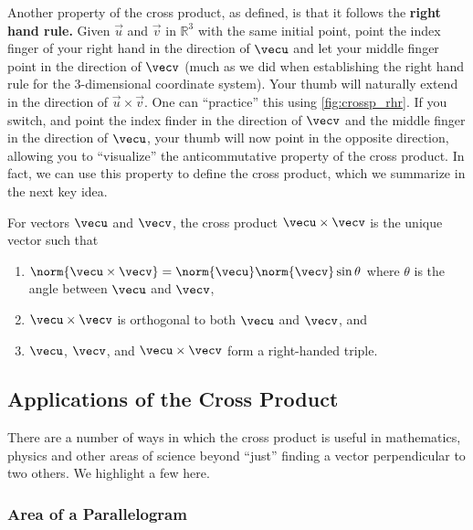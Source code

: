 Another property of the cross product, as defined, is that it follows the \textbf{right hand rule.} Given $\vec u$ and $\vec v$ in $\mathbb{R}^3$ with the same initial point, point the index finger of your right hand in the direction of $\vecu$ and let your middle finger point in the direction of $\vecv$ (much as we did when establishing the right hand rule for the 3-dimensional coordinate system). Your thumb will naturally extend in the direction of $\vec u\times\vec v$. One can ``practice'' this using \autoref{fig:crossp_rhr}. If you switch, and point the index finder in the direction of $\vecv$ and the middle finger in the direction of $\vecu$, your thumb will now point in the opposite direction, allowing you to ``visualize'' the anticommutative property of the cross product.  In fact, we can use this property to define the cross product, which we summarize in the next key idea.

\begin{keyidea}\label{ki:cross_prod_alt}%
For vectors $\vecu$ and $\vecv$, the cross product $\vecu\times\vecv$ is the unique vector such that
\begin{enumerate}
\item $\norm{\vecu\times\vecv}=\norm{\vecu}\norm{\vecv}\sin\theta$ where $\theta$ is the angle between $\vecu$ and $\vecv$,
\item $\vecu\times\vecv$ is orthogonal to both $\vecu$ and $\vecv$, 
and
\item $\vecu$, $\vecv$, and $\vecu\times\vecv$ form a right-handed triple.
\end{enumerate}
\end{keyidea}

\subsection{Applications of the Cross Product}

There are a number of ways in which the cross product is useful in mathematics, physics and other areas of science beyond ``just'' finding a vector perpendicular to two others. We highlight a few here.

\subsubsection{Area of a Parallelogram}


